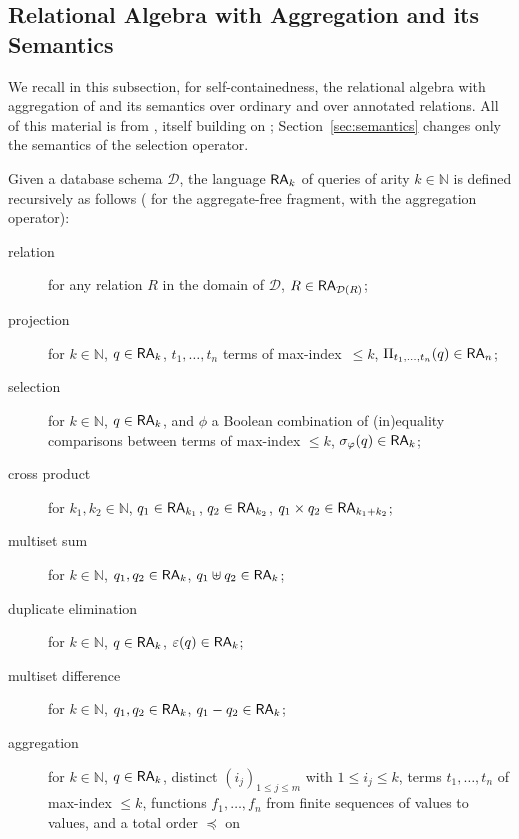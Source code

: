 \begin{toappendix}
  \subsection{Relational Algebra with Aggregation and its Semantics}
  \label{appendix:algebra}

  We recall in this subsection, for self-containedness, the relational
  algebra with aggregation of \cite{sen2026provsql} and its semantics over
  ordinary and over annotated relations. All of this material is from
  \cite{sen2026provsql}, itself building
  on \cite{green2007provenance,geerts2010database,amsterdamer2011provenance};
  Section~\ref{sec:semantics} changes only the semantics of the selection
  operator.

  Given a database schema $\mathcal{D}$, the language $\mathsf{RA}_k$ of
  queries of arity $k\in\mathbb{N}$ is
  defined recursively as follows ( for the
  aggregate-free fragment,  with the aggregation
  operator):
  \begin{description}
    \item[relation] for any relation $R$ in the domain of $\mathcal{D}$,
      $R\in\mathsf{RA}_{\mathcal{D}(R)}$;
    \item[projection] for $k\in\mathbb N$, $q\in\mathsf{RA}_{k}$,
      $t_1,\dots, t_n$ terms of max-index~\mbox{$\leq k$},
      $\Pi_{t_1,\dots,t_n}(q)\in\mathsf{RA}_n$;
    \item[selection] for $k\in\mathbb N$, $q\in\mathsf{RA}_k$, and $\phi$ a
      Boolean combination of (in)equality comparisons between terms
      of max-index $\leq k$, $\sigma_\varphi(q)\in\mathsf{RA}_k$;
    \item[cross product] for $k_1,k_2\in\mathbb N$, $q_1\in\mathsf{RA}_{k_1}$,
      $q_2\in\mathsf{RA}_{k_2}$, $q_1\times q_2\in\mathsf{RA}_{k_1+k_2}$;
    \item[multiset sum] for $k\in\mathbb N$, $q_1,q_2\in\mathsf{RA}_k$,
      $q_1\uplus q_2\in\mathsf{RA}_k$;
    \item[duplicate elimination] for $k\in\mathbb N$,
      $q\in\mathsf{RA}_k$, $\varepsilon(q)\in\mathsf{RA}_k$;
    \item[multiset difference] for $k\in\mathbb N$, $q_1,q_2\in\mathsf{RA}_k$,
      $q_1 - q_2\in\mathsf{RA}_k$;
    \item[aggregation] for $k\in\mathbb N$, $q\in\mathsf{RA}_k$, distinct
      $(i_j)_{1\leq j\leq m}$ with $1\leq i_j\leq k$, terms $t_1,\dots,
      t_n$ of max-index $\leq k$, functions $f_1,\dots,f_n$ from finite
      sequences of values to values, and a total order $\preceq$ on

\end{description}
\end{toappendix}
